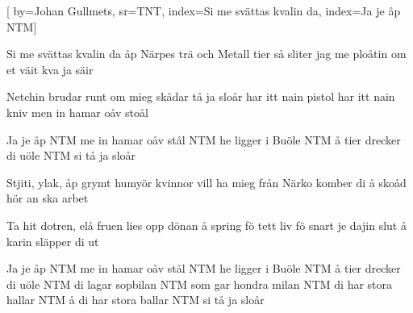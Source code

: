 

[ 		%
	by={Johan Gullmets},					%
	sr={TNT},					%
	index={Si me svättas kvalin da}, 						%
	index={Ja je åp NTM}]						%
	

\beginverse*						%
Si me svättas kvalin da
åp Närpes trä och Metall
tier så sliter jag me ploåtin
om et väit kva ja säir

Netchin brudar runt om mieg
skådar tå ja sloår
har itt nain pistol
har itt nain kniv
men in hamar oåv stoål
\endverse							%

\beginchorus
Ja je åp NTM
me in hamar oåv stål
NTM
he ligger i Buöle
NTM
å tier drecker di uöle
NTM
si tå ja sloår
\endchorus

\beginverse*						%
Stjiti, ylak, åp grymt humyör
kvinnor vill ha mieg
från Närko komber di å skoåd
hör an ska arbet

Ta hit dotren, elå fruen
lies opp dönan å spring fö tett liv
fö snart je dajin slut
å karin släpper di ut
\endverse							%

\beginchorus
Ja je åp NTM
me in hamar oåv stål
NTM
he ligger i Buöle
NTM
å tier drecker di uöle
NTM
di lagar sopbilan
NTM
som gar hondra milan
NTM
di har stora hallar
NTM
å di har stora ballar
NTM
si tå ja sloår 
\endchorus

\endsong							%


